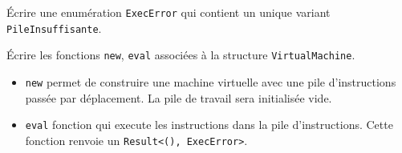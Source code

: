 \documentclass[11pt,a4paper,addpoint]{exam}
\begin{document}
\begin{questions}
\question[1] Écrire une enumération \texttt{ExecError} qui contient un unique variant \texttt{PileInsuffisante}.

\question[1] Écrire les fonctions \texttt{new}, \texttt{eval} associées à la structure \texttt{VirtualMachine}.
\begin{itemize}
    \item \texttt{new} permet de construire une machine virtuelle avec une pile d'instructions passée par déplacement. La pile de travail sera initialisée vide.
    \item \texttt{eval} fonction qui execute les instructions dans la pile d'instructions. Cette fonction renvoie un \texttt{Result<(), ExecError>}.
\end{itemize}
\vspace{5in}


\end{questions}
\end{document}
